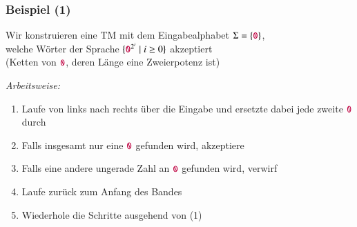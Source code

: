 \documentclass[aspectratio=1610,onlymath]{beamer}
\begin{document}
\begin{frame}\frametitle{Beispiel (1)}

Wir konstruieren eine TM mit dem Eingabealphabet $\Sigma=\{\mathtt{\textcolor{purple}{0}}\}$,\\ welche
Wörter der Sprache $\{\mathtt{\textcolor{purple}{0}}^{2^i}\mid i\geq 0\}$ akzeptiert\\
(Ketten von $\mathtt{\textcolor{purple}{0}}$, deren Länge eine Zweierpotenz ist)
\pause\bigskip

\emph{Arbeitsweise:}
\begin{enumerate}[(1)]
\item Laufe von links nach rechts über die Eingabe und ersetzte dabei jede zweite $\mathtt{\textcolor{purple}{0}}$ durch
\item Falls insgesamt nur eine $\mathtt{\textcolor{purple}{0}}$ gefunden wird, akzeptiere
\item Falls eine andere ungerade Zahl an $\mathtt{\textcolor{purple}{0}}$ gefunden wird, verwirf
\item Laufe zurück zum Anfang des Bandes
\item Wiederhole die Schritte ausgehend von (1)
\end{enumerate}

\end{frame}
\end{document}
